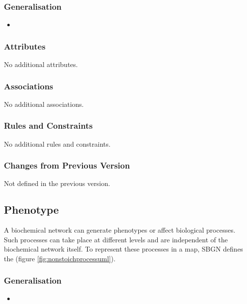 \subsubsection{Generalisation}

\begin{itemize}
\item {}
\end{itemize}

\subsubsection{Attributes}

No additional attributes.

\subsubsection{Associations}

No additional associations.

\subsubsection{Rules and Constraints}

No additional rules and constraints.

\subsubsection{Changes from Previous Version}

Not defined in the previous version.

\subsection{Phenotype}

A biochemical network can generate phenotypes or affect biological
processes.  Such processes can take place at different levels and are
independent of the biochemical network itself.  To represent these
processes in a map, SBGN defines the  (figure \ref{fig:nonstoichprocessuml}).

\subsubsection{Generalisation}

\begin{itemize}
\item {}
\end{itemize}

